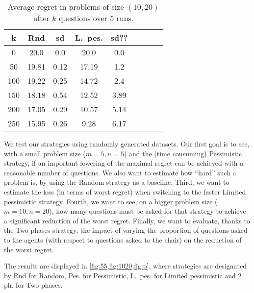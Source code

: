 \documentclass[sigconf, anonymous]{aamas}
\begin{document}
\begin{table}
	\begin{center}
		\begin{tabular}{S[table-figures-integer=3, table-number-alignment = right, table-figures-decimal=0]S[table-number-alignment = right]@{ ± }S[table-number-alignment = left]S[table-number-alignment = right]@{ ± }S[table-number-alignment = left]S[table-number-alignment = right]@{ ± }S[table-number-alignment = left]S[table-number-alignment = right]@{ ± }S[table-number-alignment = left]}
			\toprule
			{k} & {Rnd} & {sd} & {L.\ pes.} & {sd??} \\
			 & 20.0 & 0.0 & 20.0 & 0.0 \\
			50 & 19.81 & 0.12 & 17.19 & 1.2 \\
			100 & 19.22 & 0.25 & 14.72 & 2.4 \\
			150 & 18.18 & 0.54 & 12.52 & 3.89 \\
			200 & 17.05  & 0.29 & 10.57 & 5.14 \\
			250 & 15.95 & 0.26 & 9.28 & 6.17 \\
			\bottomrule
		\end{tabular}
	\end{center}
	\caption{Average regret in problems of size $(10, 20)$ after $k$ questions over $5$ runs.}
	\label{fig:1020}
\end{table}

We test our strategies using randomly generated datasets. 
Our first goal is to see, with a small problem size ($m = 5, n = 5$) and the (time consuming) Pessimistic strategy, if an important lowering of the maximal regret can be achieved with a reasonable number of questions. We also want to estimate how “hard” such a problem is, by using the Random strategy as a baseline. Third, we want to estimate the loss (in terms of worst regret) when switching to the faster Limited pessimistic strategy. Fourth, we want to see, on a bigger problem size ($m = 10, n = 20$), how many questions must be asked for that strategy to achieve a significant reduction of the worst regret. Finally, we want to evaluate, thanks to the Two phases strategy, the impact of varying the proportion of questions asked to the agents (with respect to questions asked to the chair) on the reduction of the worst regret.

The results are displayed in \cref{fig:55,fig:1020,fig:p}, where strategies are designated by Rnd for Random, Pes. for Pessimistic, L.\ pes. for Limited pessimistic and 2 ph. for Two phases. 
\end{document}
